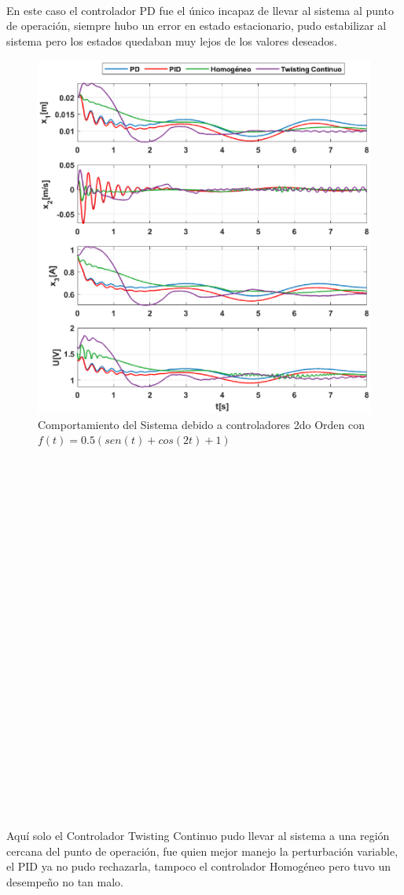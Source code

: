 \documentclass[onecolumn,10pt]{article}
\begin{document}
\\
\\
\\
En este caso el controlador PD fue el \'unico incapaz de llevar al sistema al punto de operaci\'on, siempre hubo un error en estado estacionario, pudo estabilizar al sistema pero los estados quedaban muy lejos de los valores deseados.
\begin{figure}[!h]
\centering
\includegraphics[scale=0.55]{xu_3o_c2o_pv.eps}
\caption{Comportamiento del Sistema debido a controladores 2do Orden con $f(t)=0.5(sen(t)+cos(2t)+1)$}
\end{figure}
\\
\\
\\
\\
\\
\\
\\
\\
\\
\\
\\
\\
\\
\\
\\
\\
\\
\\
\\
\\
\\
\\
\\
\\
Aqu\'i solo el Controlador Twisting Continuo pudo llevar al sistema a una regi\'on cercana del punto de operaci\'on, fue quien mejor manejo la perturbaci\'on variable, el PID ya no pudo rechazarla, tampoco el controlador Homog\'eneo pero tuvo un desempe\~no no tan malo.
\end{document}
